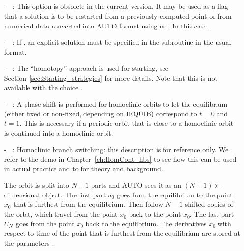 \documentclass[12pt]{report}
\begin{document}
\subsection{}  \label{sec:ISTART}
\begin{itemize}
\item[-] ~:  
This option is obsolete in the current version. 
It may be used as a flag that a solution is to be
restarted from a previously computed point or
from numerical data converted into {\cal AUTO} format using
 or .
In this case .
\item[-] ~: 
If , an explicit solution must be specified in the
subroutine  in the usual format. 
\item[-] ~: 
The ``homotopy'' approach is used for starting, see 
Section~\ref{sec:Starting_strategies} 
for more details. Note that this is not available with the choice 
.
\item[-] ~:
A phase-shift is performed for homoclinic orbits to let the
equilibrium (either fixed or non-fixed, depending on IEQUIB)
correspond to $t=0$ and $t=1$. This is necessary if a periodic
orbit that is close to a homoclinic orbit is continued into
a homoclinic orbit.
\item[-] ~:
Homoclinic branch switching: this description is for reference only.
We refer to the demo in Chapter~\ref{ch:HomCont_hbs} to see how this
can be used in actual practice and to  for
theory and background.

The orbit is split into $N+1$ parts and
{\cal AUTO} sees it as an $(N+1)\times$-dimensional object.
The first part $u_0$ goes from the equilibrium to the point $x_0$ that is 
furthest from the equilibrium. 
Then follow $N-1$ shifted copies of the orbit, which travel
from the point $x_0$ back to the point $x_0$. The last part $U_N$
goes from the point $x_0$ back to the equilibrium. 
The derivatives $\dot{x}_0$ with respect to time
of the point that is furthest from the equilibrium are stored at the 
parameters .


\end{itemize}
\end{document}
